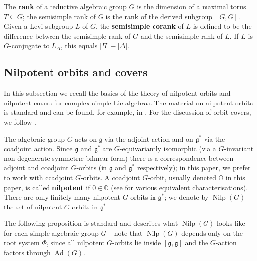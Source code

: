 \documentclass[11pt]{amsart}
\renewcommand{\O}{{\mathbb O}}
\newcommand{\g}{{\mathfrak g}}
\newcommand{\Ad}{\operatorname{Ad}}
\newcommand{\Nilp}{\operatorname{Nilp}}
\numberwithin{equation}{section}
\begin{document}
	The {\bf rank} of a reductive algebraic group $G$ is the dimension of a maximal torus $T\subseteq G$; the semisimple rank of $G$ is the rank of the derived subgroup $[G,G]$. Given a Levi subgroup $L$ of $G$, the {\bf semisimple corank} of $L$ is defined to be the difference between the semisimple rank of $G$ and the semisimple rank of $L$. If $L$ is $G$-conjugate to $L_\Delta$, this equals $\left\vert\Pi\right \vert-\left\vert\Delta\right \vert$.
	
	\subsection{Nilpotent orbits and covers}\label{ss: NilpOrbs}
	
	In this subsection we recall the basics of the theory of nilpotent orbits and nilpotent covers for complex simple Lie algebras. The material on nilpotent orbits is standard and can be found, for example, in \cite{CM}. For the discussion of orbit covers, we follow \cite{LMM}.
	
	The algebraic group $G$ acts on $\g$ via the adjoint action and on $\g^{*}$ via the coadjoint action. Since $\g$ and $\g^{*}$ are $G$-equivariantly isomorphic (via a $G$-invariant non-degenerate symmetric bilinear form) there is a correspondence between adjoint and coadjoint $G$-orbits (in $\g$ and $\g^{*}$ respectively); in this paper, we prefer to work with coadjoint $G$-orbits. A coadjoint $G$-orbit, usually denoted $\O$ in this paper, is called {\bf nilpotent} if $0\in \overline{\O}$ (see \cite[\S1.3]{CM} for various equivalent characterisations). There are only finitely many nilpotent $G$-orbits in $\g^{*}$; we denote by $\Nilp(G)$ the set of nilpotent $G$-orbits in $\g^{*}$.
	
	The following proposition is standard and describes what $\Nilp(G)$ looks like for each simple algebraic group $G$ -- note that $\Nilp(G)$ depends only on the root system $\Phi$, since all nilpotent $G$-orbits lie inside $[\g,\g]$ and the $G$-action factors through $\Ad(G)$.
	
\end{document}
